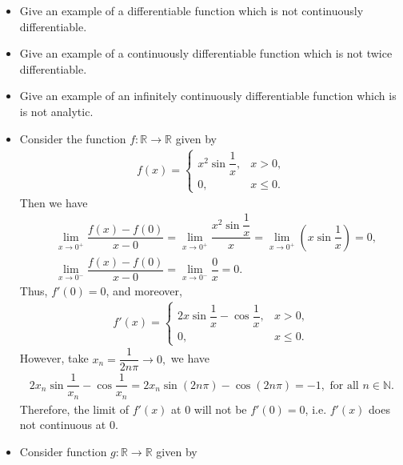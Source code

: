 \begin{problem}
\begin{itemize}
    \item[(a)] Give an example of a differentiable function which is not continuously differentiable.
    \item[(b)]Give an example of a continuously differentiable function which is not twice differentiable.
    \item[(c)]Give an example of an infinitely continuously differentiable function which is is not analytic.
\end{itemize}
\begin{solution}
\begin{itemize}
    \item[(a)] Consider the function $f:\mathbb{R}\rightarrow\mathbb{R}$ given by
    \begin{align*}
        f(x)=\begin{cases}
        x^2\sin\dfrac{1}{x},&x>0,\\
        0,&x\le 0.
        \end{cases}
    \end{align*}
    Then we have 
      \begin{align*}
            &\lim_{x\rightarrow 0^+}\dfrac{f(x)-f(0)}{x-0}=\lim_{x\rightarrow 0^+}\dfrac{x^2\sin\dfrac{1}{x}}{x}=\lim_{x\rightarrow 0^+}(x\sin\dfrac{1}{x})=0,\\
            &\lim_{x\rightarrow 0^-}\dfrac{f(x)-f(0)}{x-0}=\lim_{x\rightarrow 0^-}\dfrac{0}{x}=0.
        \end{align*}
        Thus, $f'(0)=0$, and moreover,
        \begin{align*}
            f'(x)=\begin{cases}
            2x\sin\dfrac{1}{x}-\cos\dfrac{1}{x},&x>0,\\
            0,&x\le 0.
            \end{cases}
        \end{align*}
        However, take $x_n=\dfrac{1}{2n\pi}\rightarrow0,$ we have 
        \begin{align*}
            2x_n\sin\dfrac{1}{x_n}-\cos\dfrac{1}{x_n}=2x_n\sin(2n\pi)-\cos(2n\pi)=-1,\text{ for all }n\in\mathbb{N}.
        \end{align*}
        Therefore, the limit of $f'(x)$ at $0$ will not be $f'(0)=0$, i.e. $f'(x)$ does not continuous at $0.$
    \item[(b)]Consider function $g:\mathbb{R}\rightarrow\mathbb{R}$ given by
    \begin{align*}

\end{align*}
\end{itemize}
\end{solution}
\end{problem}
